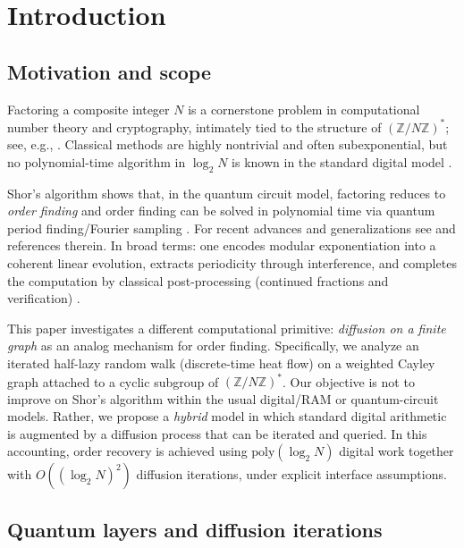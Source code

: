 \documentclass[11pt,reqno]{article}
\numberwithin{equation}{section}
\theoremstyle{plain}
\theoremstyle{definition}
\theoremstyle{remark}
\newcommand{\Z}{\mathbb{Z}}
\newcommand{\poly}{\mathrm{poly}}
\begin{document}
\section{Introduction}
\label{sec:intro}

\subsection{Motivation and scope}

Factoring a composite integer $N$ is a cornerstone problem in computational number theory and cryptography, intimately tied to the structure of $(\Z/N\Z)^\ast$; see, e.g., \cite{HardyWright,CrandallPomerance,MenezesBook,BachShallit}.  Classical methods are highly nontrivial and often subexponential, but no polynomial-time algorithm in $\log_2 N$ is known in the standard digital model \cite{CrandallPomerance}.

Shor's algorithm shows that, in the quantum circuit model, factoring reduces to \emph{order finding} and order finding can be solved in polynomial time via quantum period finding/Fourier sampling \cite{Shor94, Sh97, NC10, EkertJozsa96}. For recent advances and generalizations see \cite{CBK22, Hh25, Ra24, Re25, XQLM23} and references therein.  In broad terms: one encodes modular exponentiation into a coherent linear evolution, extracts periodicity through interference, and completes the computation by classical post-processing (continued fractions and verification) \cite{Shor94,  Sh97, KSV99, NC10}.

This paper investigates a different computational primitive: \emph{diffusion on a finite graph} as an analog mechanism for order finding.  Specifically, we analyze an iterated half-lazy random walk (discrete-time heat flow) on a weighted Cayley graph attached to a cyclic subgroup of $(\Z/N\Z)^\ast$.  Our objective is not to improve on Shor's algorithm within the usual digital/RAM or quantum-circuit models.  Rather, we propose a \emph{hybrid} model in which standard digital arithmetic is augmented by a diffusion process that can be iterated and queried.  In this accounting, order recovery is achieved using $\poly(\log_2 N)$ digital work together with $O((\log_2 N)^2)$ diffusion iterations, under explicit interface assumptions.

\subsection{Quantum layers and diffusion iterations}
\end{document}
